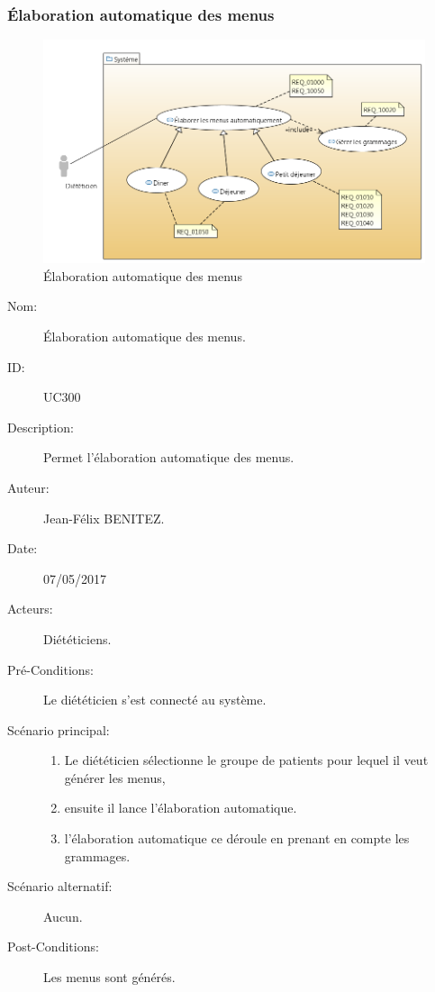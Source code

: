 \subsubsection{Élaboration automatique des menus}
\begin{figure}[H]
\label{MenuGen}
  \centering
      \includegraphics[width=1.00\textwidth]{../../CasDUtilisations/MenuGen/MenuGen.png} %
\caption{Élaboration automatique des menus}
\end{figure}

\begin{description}
\item[Nom:] Élaboration automatique des menus.
\item[ID:] UC300
\item[Description:] Permet l'élaboration automatique des menus.
\item[Auteur:] Jean-Félix BENITEZ.
\item[Date:] 07/05/2017
\item[Acteurs:] Diététiciens.
\item[Pré-Conditions:] Le diététicien s'est connecté au système.
\item[Scénario principal:]
  \begin{enumerate}
  \item Le diététicien sélectionne le groupe de patients pour lequel il veut générer les menus,
  \item ensuite il lance l'élaboration automatique.
  \item l'élaboration automatique ce déroule en prenant en compte les grammages.
  \end{enumerate}
\item[Scénario alternatif:] Aucun.
\item[Post-Conditions:] Les menus sont générés.
\end{description}
